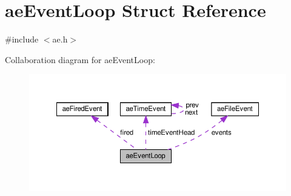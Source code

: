 \hypertarget{structae_event_loop}{}\section{ae\+Event\+Loop Struct Reference}
\label{structae_event_loop}


{\ttfamily \#include $<$ae.\+h$>$}



Collaboration diagram for ae\+Event\+Loop\+:
\nopagebreak
\begin{figure}[H]
\begin{center}
\leavevmode
\includegraphics[width=350pt]{structae_event_loop__coll__graph}
\end{center}
\end{figure}
